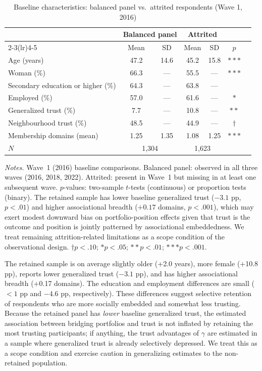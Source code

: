 \documentclass[12pt, a4paper]{article}
\newcommand{\tablenote}[1]{\vspace{4pt}\par\footnotesize\textit{Notes.} #1}
\begin{document}
\begin{table}[H]
\centering
\caption{Baseline characteristics: balanced panel vs.\ attrited respondents (Wave 1, 2016)}
\label{tab:A1_attrition}
\small
\begin{tabular}{lcccccc}
\hline\hline
  & \multicolumn{2}{c}{Balanced panel} & \multicolumn{2}{c}{Attrited} & \\
  \cmidrule(lr){2-3}\cmidrule(lr){4-5}
  & Mean & SD & Mean & SD & $p$ \\
\hline
  Age (years)                          & 47.2 & 14.6 & 45.2 & 15.8 & $***$ \\
  Woman (\%)                           & 66.3 & ---  & 55.5 & ---  & $***$ \\
  Secondary education or higher (\%)   & 64.3 & ---  & 63.8 & ---  &       \\
  Employed (\%)                        & 57.0 & ---  & 61.6 & ---  & $*$   \\
  Generalized trust (\%)               &  7.7 & ---  & 10.8 & ---  & $**$  \\
  Neighbourhood trust (\%)             & 48.5 & ---  & 44.9 & ---  & $\dagger$ \\
  Membership domains (mean)            &  1.25 & 1.35 & 1.08 & 1.25 & $***$ \\
\hline
  $N$ & \multicolumn{2}{c}{1,304} & \multicolumn{2}{c}{1,623} & \\
\hline\hline
\end{tabular}
\tablenote{Wave~1 (2016) baseline comparisons. Balanced panel: observed in all
three waves (2016, 2018, 2022). Attrited: present in Wave~1 but missing in at
least one subsequent wave. $p$-values: two-sample $t$-tests (continuous) or
proportion tests (binary). The retained sample has lower baseline generalized
trust ($-3.1$ pp, $p < .01$) and higher associational breadth ($+0.17$ domains,
$p < .001$), which may exert modest downward bias on portfolio-position effects
given that trust is the outcome and position is jointly patterned by associational
embeddedness. We treat remaining attrition-related limitations as a scope
condition of the observational design.
$\dagger p<.10$; $* p<.05$; $** p<.01$; $*** p<.001$.}
\end{table}

The retained sample is on average slightly older (+2.0 years), more
female (+10.8 pp), reports lower generalized trust ($-3.1$ pp), and has
higher associational breadth (+0.17 domains). The education and employment
differences are small ($<1$ pp and $-4.6$ pp, respectively). These
differences suggest selective retention of respondents who are more socially
embedded and somewhat less trusting. Because the retained panel has
\textit{lower} baseline generalized trust, the estimated association between
bridging portfolios and trust is not inflated by retaining the most
trusting participants; if anything, the trust advantages of $\gamma$ are
estimated in a sample where generalized trust is already selectively
depressed. We treat this as a scope condition and exercise caution in
generalizing estimates to the non-retained population.
\end{document}
